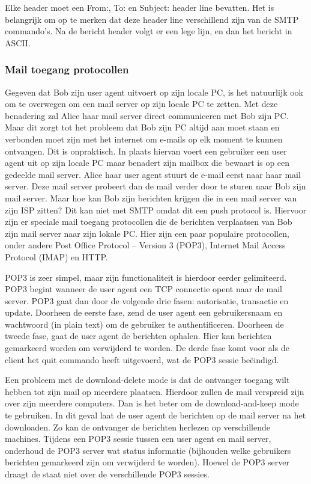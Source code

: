 Elke header moet een From:, To: en Subject: header line bevatten. Het is belangrijk om op te merken dat deze header line verschillend zijn van de SMTP commando’s. Na de bericht header volgt er een lege lijn, en dan het bericht in ASCII.

\subsubsection{Mail toegang protocollen}

Gegeven dat Bob zijn user agent uitvoert op zijn locale PC, is het natuurlijk ook om te overwegen om een mail server op zijn locale PC te zetten. Met deze benadering zal Alice haar mail server direct communiceren met Bob zijn PC. Maar dit zorgt tot het probleem dat Bob zijn PC altijd aan moet staan en verbonden moet zijn met het internet om e-mails op elk moment te kunnen ontvangen. Dit is onpraktisch. In plaats hiervan voert een gebruiker een user agent uit op zijn locale PC maar benadert zijn mailbox die bewaart is op een gedeelde mail server.
Alice haar user agent stuurt de e-mail eerst naar haar mail server. Deze mail server probeert dan de mail verder door te sturen naar Bob zijn mail server.
Maar hoe kan Bob zijn berichten krijgen die in een mail server van zijn ISP zitten? Dit kan niet met SMTP omdat dit een push protocol is. Hiervoor zijn er speciale mail toegang protocollen die de berichten verplaatsen van Bob zijn mail server naar zijn lokale PC. Hier zijn een paar populaire protocollen, onder andere Post Office Protocol – Version 3 (POP3), Internet Mail Access Protocol (IMAP) en HTTP.

\clearpage


POP3 is zeer simpel, maar zijn functionaliteit is hierdoor eerder gelimiteerd. POP3 begint wanneer de user agent een TCP connectie opent naar de mail server. POP3 gaat dan door de volgende drie fasen: autorisatie, transactie en update. Doorheen de eerste fase, zend de user agent een gebruikersnaam en wachtwoord (in plain text) om de gebruiker te authentificeren. Doorheen de tweede fase, gaat de user agent de berichten ophalen. Hier kan berichten gemarkeerd worden om verwijderd te worden. De derde fase komt voor als de client het quit commando heeft uitgevoerd, wat de POP3 sessie beëindigd.

Een probleem met de download-delete mode is dat de ontvanger toegang wilt hebben tot zijn mail op meerdere plaatsen. Hierdoor zullen de mail verspreid zijn over zijn meerdere computers.
Dan is het beter om de download-and-keep mode te gebruiken. In dit geval laat de user agent de berichten op de mail server na het downloaden. Zo kan de ontvanger de berichten herlezen op verschillende machines.
Tijdens een POP3 sessie tussen een user agent en mail server, onderhoud de POP3 server wat status informatie (bijhouden welke gebruikers berichten gemarkeerd zijn om verwijderd te worden). Hoewel de POP3 server draagt de staat niet over de verschillende POP3 sessies.

